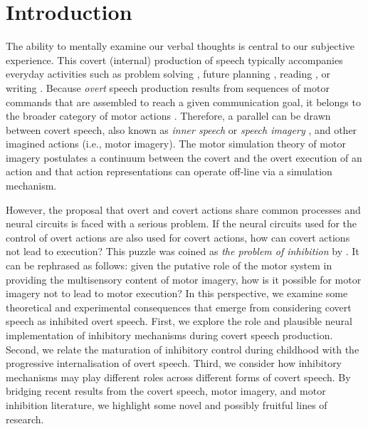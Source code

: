 \documentclass[utf8]{template/frontiersSCNS} %
\begin{document}
\newpage

\section{Introduction}

The ability to mentally examine our verbal thoughts is central to our subjective experience. This covert (internal)  production of speech typically accompanies everyday activities such as problem solving \citep{baldo_is_2005, sokolov_inner_1972}, future planning \citep{dargembeau_frequency_2011}, reading \citep[e.g.,][]{loevenbruck_left_2005, perrone-bertolotti_how_2012}, or writing \citep{frith_reading_1979}. Because \textit{overt} speech production results from sequences of motor commands that are assembled to reach a given communication goal, it belongs to the broader category of motor actions \citep{jeannerod_motor_2006}. Therefore, a parallel can be drawn between covert speech, also known as \textit{inner speech} or \textit{speech imagery} \citep[for reviews, see][]{alderson-day_inner_2015, perrone-bertolotti_what_2014, loevenbruck_cognitive_2018}, and other imagined actions (i.e., motor imagery). The motor simulation theory of motor imagery \citep{jeannerod_representing_1994, jeannerod_neural_2001, jeannerod_origin_2006} postulates a continuum between the covert and the overt execution of an action and that action representations can operate off-line via a simulation mechanism.

However, the proposal that overt and covert actions share common processes and neural circuits is faced with a serious problem. If the neural circuits used for the control of overt actions are also used for covert actions, how can covert actions not lead to execution? This puzzle was coined as \textit{the problem of inhibition} by \cite{jeannerod_neural_2001}. It can be rephrased as follows: given the putative role of the motor system in providing the multisensory content of motor imagery, how is it possible for motor imagery not to lead to motor execution? In this perspective, we examine some theoretical and experimental consequences that emerge from considering covert speech as inhibited overt speech. First, we explore the role and plausible neural implementation of inhibitory mechanisms during covert speech production. Second, we relate the maturation of inhibitory control during childhood with the progressive internalisation of overt speech. Third, we consider how inhibitory mechanisms may play different roles across different forms of covert speech. By bridging recent results from the covert speech, motor imagery, and motor inhibition literature, we highlight some novel and possibly fruitful lines of research.
\end{document}
